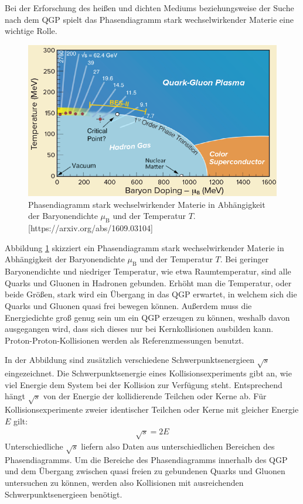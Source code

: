 Bei der Erforschung des hei{\ss}en und dichten Mediums beziehungsweise der Suche nach dem QGP spielt das Phasendiagramm stark wechselwirkender Materie eine wichtige Rolle.
\begin{figure}[tbp]
\centering
\includegraphics[width=.7\linewidth]{QGPPhaseDiagram.png}
\caption{Phasendiagramm stark wechselwirkender Materie in Abh\"angigkeit der Baryonendichte $\mu_{\text{B}}$ und der Temperatur $T$.
[https://arxiv.org/abs/1609.03104]}
\label{fig:QGPPhase}
\end{figure}
Abbildung \ref{fig:QGPPhase} skizziert ein Phasendiagramm stark wechselwirkender Materie in Abh\"angigkeit der Baryonendichte $\mu_{\text{B}}$ und der Temperatur $T$.
Bei geringer Baryonendichte und niedriger Temperatur, wie etwa Raumtemperatur, sind alle Quarks und Gluonen in Hadronen gebunden.
Erh\"oht man die Temperatur, oder beide Gr\"o{\ss}en, stark wird ein \"Ubergang in das QGP erwartet, in welchem sich die Quarks und Gluonen quasi frei bewegen k\"onnen.
Au{\ss}erdem muss die Energiedichte gro{\ss} genug sein um ein QGP erzeugen zu k\"onnen, weshalb davon ausgegangen wird, dass sich dieses nur bei Kernkollisionen ausbilden kann.
Proton-Proton-Kollisionen werden als Referenzmessungen benutzt.

In der Abbildung sind zus\"atzlich verschiedene Schwerpunktsenergieen $\sqrt{s}$ eingezeichnet.
Die Schwerpunktsenergie eines Kollisionsexperiments gibt an, wie viel Energie dem System bei der Kollision zur Verf\"ugung steht.
Entsprechend h\"angt $\sqrt{s}$ von der Energie der kollidierende Teilchen oder Kerne ab.
F\"ur Kollisionsexperimente zweier identischer Teilchen oder Kerne mit gleicher Energie $E$ gilt:
\begin{align}
\sqrt{s} = 2E \label{eq:sqrts}
\end{align}
Unterschiedliche $\sqrt{s}$ liefern also Daten aus unterschiedlichen Bereichen des Phasendiagramms.
Um die Bereiche des Phasendiagramms innerhalb des QGP und dem \"Ubergang zwischen quasi freien zu gebundenen Quarks und Gluonen untersuchen zu k\"onnen, werden also Kollisionen mit ausreichenden Schwerpunktsenergieen ben\"otigt.

